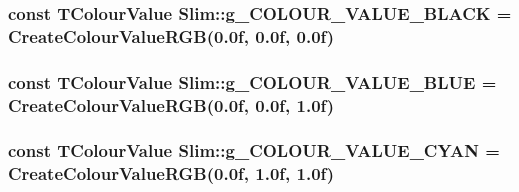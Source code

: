 \subsubsection[{g\+\_\+\+C\+O\+L\+O\+U\+R\+\_\+\+V\+A\+L\+U\+E\+\_\+\+B\+L\+A\+C\+K}]{\setlength{\rightskip}{0pt plus 5cm}const {\bf T\+Colour\+Value} Slim\+::g\+\_\+\+C\+O\+L\+O\+U\+R\+\_\+\+V\+A\+L\+U\+E\+\_\+\+B\+L\+A\+C\+K = {\bf Create\+Colour\+Value\+R\+G\+B}(0.\+0f, 0.\+0f, 0.\+0f)}\label{namespace_slim_ae8fc69dad906fd2dda213c5f71c59923}
\hypertarget{namespace_slim_a583e99a4fe716782182405126b9d97ea}{}
\subsubsection[{g\+\_\+\+C\+O\+L\+O\+U\+R\+\_\+\+V\+A\+L\+U\+E\+\_\+\+B\+L\+U\+E}]{\setlength{\rightskip}{0pt plus 5cm}const {\bf T\+Colour\+Value} Slim\+::g\+\_\+\+C\+O\+L\+O\+U\+R\+\_\+\+V\+A\+L\+U\+E\+\_\+\+B\+L\+U\+E = {\bf Create\+Colour\+Value\+R\+G\+B}(0.\+0f, 0.\+0f, 1.\+0f)}\label{namespace_slim_a583e99a4fe716782182405126b9d97ea}
\hypertarget{namespace_slim_a411f3278744ab504f50bbf0a0991a603}{}
\subsubsection[{g\+\_\+\+C\+O\+L\+O\+U\+R\+\_\+\+V\+A\+L\+U\+E\+\_\+\+C\+Y\+A\+N}]{\setlength{\rightskip}{0pt plus 5cm}const {\bf T\+Colour\+Value} Slim\+::g\+\_\+\+C\+O\+L\+O\+U\+R\+\_\+\+V\+A\+L\+U\+E\+\_\+\+C\+Y\+A\+N = {\bf Create\+Colour\+Value\+R\+G\+B}(0.\+0f, 1.\+0f, 1.\+0f)}\label{namespace_slim_a411f3278744ab504f50bbf0a0991a603}
\hypertarget{namespace_slim_a74ceafe45f27d59e1e7a540771745597}{}
